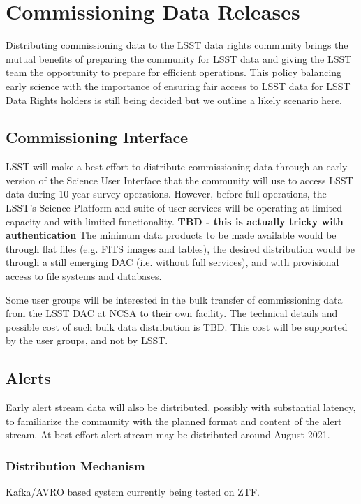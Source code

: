\section{Commissioning Data Releases} \label{sect:commissioning}

Distributing commissioning data to the LSST data rights community brings the mutual benefits
of preparing the community for LSST data and giving the LSST team the opportunity to prepare
for efficient operations. This policy balancing
early science with the importance of ensuring fair access to LSST data for LSST Data Rights
holders is still being decided but we outline a likely scenario here.

\subsection{Commissioning Interface} \label{sect:cominterface}

LSST will make a best effort to distribute commissioning data through an early version of the
Science User Interface that the community will use to access LSST data during 10-year survey
operations. However, before full operations, the LSST’s Science Platform and suite of user
services will be operating at limited capacity and with limited functionality.
{\bf TBD - this is actually tricky with authentication}
The minimum data
products to be made available would be through flat files (e.g. FITS images and tables), the
desired distribution would be through a still emerging DAC (i.e. without full services), and with
provisional access to file systems and databases.

Some user groups will be interested in the bulk transfer of commissioning data from the LSST
DAC at NCSA to their own facility. The technical details and possible cost of such bulk data
distribution is TBD. This cost will be supported by the user groups, and not by LSST.

\subsection{Alerts} \label{sect:alerts}
Early alert stream data will also be distributed, possibly with substantial latency, to
familiarize the community with the planned format and content of the alert stream.
At best-effort alert stream may be distributed around August 2021.

\subsubsection{Distribution Mechanism}
Kafka/AVRO based system currently being tested on ZTF.

